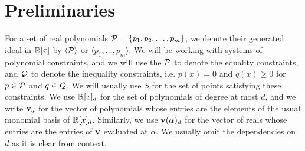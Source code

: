 \section{Preliminaries}
\label{sec:prelims}
For a set of real polynomials $\mathcal P = \{p_1, p_2, \dots, p_m\}$, we denote their generated ideal in $\mathbb R[x]$ by $\langle \mathcal P\rangle$ or $\langle p_1, \dots, p_m\rangle$. We will be working with systems of polynomial constraints, and we will use the $\mathcal P$ to denote the equality constraints, and $\mathcal Q$ to denote the inequality constraints, i.e. $p(x) = 0$ and $q(x) \geq 0$ for $p \in \mathcal P$ and $q \in \mathcal Q$. We will usually use $S$ for the set of points satisfying these constraints. We use $\mathbb R[x]_d$ for the set of polynomials of degree at most $d$, and we write ${\bf v}_d$ for the vector of polynomials whose entries are the elements of the usual monomial basis of $\mathbb R[x]_d$. Similarly, we use ${\bf v}(\alpha)_d$ for the vector of reals whose entries are the entries of ${\bf v}$ evaluated at $\alpha$. We usually omit the dependencies on $d$ as it is clear from context.

